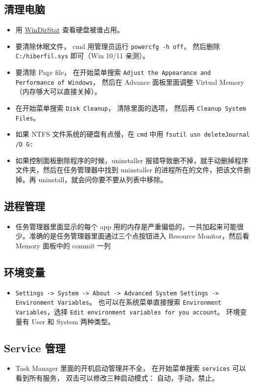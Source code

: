 \subsection{清理电脑}
\begin{itemize}
\item 用 \href{https://windirstat.net/}{WinDirStat} 查看硬盘被谁占用。
\item 要清除休眠文件， cmd 用管理员运行 \verb`powercfg -h off`， 然后删除 \verb`C:/hiberfil.sys` 即可（Win 10/11 亲测）。
\item 要清除 Page file， 在开始菜单搜索 \verb`Adjust the Appearance and Performance of Windows`， 然后在 Advance 面板里面调整 Virtual Memory（内存够大可以直接关掉）。
\item 在开始菜单搜索 \verb`Disk Cleanup`， 清除里面的选项， 然后再 \verb`Cleanup System Files`。
\item 如果 NTFS 文件系统的硬盘有点慢，在 \verb`cmd` 中用 \verb`fsutil usn deleteJournal /D G:`
\item 如果控制面板删除程序的时候，uninstaller 报错导致删不掉，就手动删掉程序文件夹，然后在任务管理器中找到 uninstaller 的进程所在的文件，把该文件删掉。再 uninstall，就会问你要不要从列表中移除。
\end{itemize}

\subsection{进程管理}
\begin{itemize}
\item 任务管理器里面显示的每个 app 用的内存是严重偏低的，一共加起来可能很少。准确的是任务管理器里面通过三个点按钮进入 Resource Monitor，然后看 Memory 面板中的 commit 一列
\end{itemize}

\subsection{环境变量}
\begin{itemize}
\item \verb`Settings -> System -> About -> Advanced System Settings -> Environment Variables`。 也可以在系统菜单直接搜索 \verb`Environment Variables`，选择 \verb`Edit environment variables for you account`。 环境变量有 User 和 System 两种类型。
\end{itemize}

\subsection{Service 管理}
\begin{itemize}
\item Task Manager 里面的开机启动管理并不全， 在开始菜单搜索 \verb`services` 可以看到所有服务， 双击可以修改三种启动模式： 自动，手动，禁止。
\end{itemize}

